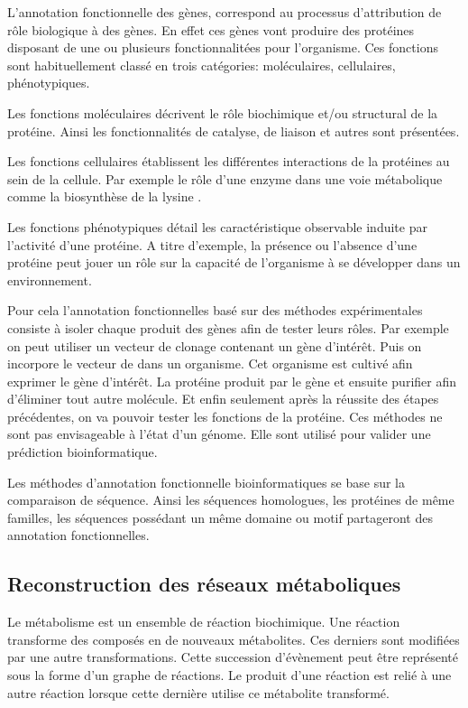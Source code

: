 \begin{refsection}
    L’annotation fonctionnelle des gènes, correspond au processus d’attribution de rôle biologique à des gènes. En effet ces gènes vont produire des protéines disposant de une ou plusieurs fonctionnalitées pour l’organisme. Ces fonctions sont habituellement classé en trois catégories: moléculaires, cellulaires, phénotypiques.
    
    Les fonctions moléculaires décrivent le rôle biochimique et/ou structural de la protéine. Ainsi les fonctionnalités de catalyse, de liaison et autres sont présentées.
    
    Les fonctions cellulaires établissent les différentes interactions de la protéines au sein de la cellule. Par exemple le rôle d’une enzyme dans une voie métabolique comme la biosynthèse de la lysine . 
    
    Les fonctions phénotypiques détail les caractéristique observable induite par l’activité d’une protéine. A titre d’exemple, la présence ou l’absence d’une protéine peut jouer un rôle sur la capacité de l’organisme à se développer dans un environnement.
    
    Pour cela l’annotation fonctionnelles basé sur des méthodes expérimentales consiste à isoler chaque produit des gènes afin de tester leurs rôles. Par exemple on peut utiliser un vecteur de clonage contenant un gène d'intérêt. Puis on incorpore le vecteur de dans un organisme. Cet organisme est cultivé afin exprimer le gène d'intérêt. La protéine produit par le gène et ensuite purifier afin d'éliminer tout autre molécule. Et enfin seulement après la réussite des étapes précédentes, on va pouvoir tester les fonctions de la protéine.  Ces méthodes ne sont  pas envisageable à l’état d’un génome. Elle sont utilisé pour valider une prédiction bioinformatique.
    
    Les méthodes d’annotation fonctionnelle  bioinformatiques se base sur la comparaison de séquence. Ainsi les séquences homologues, les protéines de même familles, les séquences possédant un même domaine ou motif partageront des annotation fonctionnelles.
    
    \subsection{Reconstruction des réseaux métaboliques}
    Le métabolisme est un ensemble de réaction biochimique. Une réaction transforme des composés en de nouveaux métabolites. Ces derniers sont modifiées par une autre transformations. Cette succession d'évènement peut être représenté sous la forme d’un graphe de réactions. Le produit d’une réaction est relié à une autre réaction lorsque cette dernière utilise ce métabolite transformé.
    

\end{refsection}
